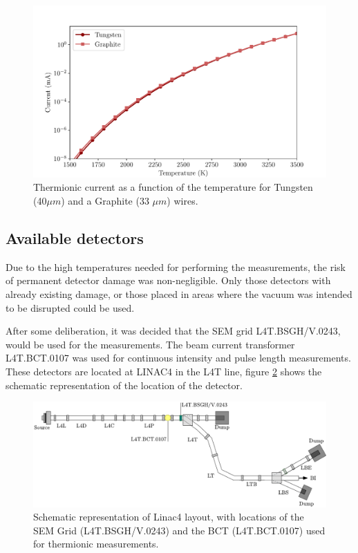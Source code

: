 \begin{figure}[h]
    \centering
    \includegraphics[width=0.80\columnwidth]{Figure_ThermoionicCurrent/ThermoCurrent.pdf}
    \caption{Thermionic current as a function of the temperature for Tungsten (40$\mu m$) and a Graphite (33 $\mu m$) wires.}
    \label{fig:ThermCurrent}
\end{figure}

\subsection{Available detectors}

Due to the high temperatures needed for performing the measurements, the risk of permanent detector damage was non-negligible. Only those detectors with already existing damage, or those placed in areas where the vacuum was intended to be disrupted could be used. 

After some deliberation, it was decided that the SEM grid L4T.BSGH/V.0243, would be used for the measurements. The beam current transformer L4T.BCT.0107 was used for continuous intensity and pulse length measurements. These detectors are located at LINAC4 in the L4T line, figure \ref{fig:DetLocation} shows the schematic representation of the location of the detector. 


\begin{figure}[h]
    \centering
    \includegraphics[width=0.90\columnwidth]{Figure_RelativePositionSemBCT/DetPosition.pdf}
    \caption{Schematic representation of Linac4 layout, with locations of the SEM Grid (L4T.BSGH/V.0243) and the BCT (L4T.BCT.0107) used for thermionic measurements.}
    \label{fig:DetLocation}
\end{figure}

